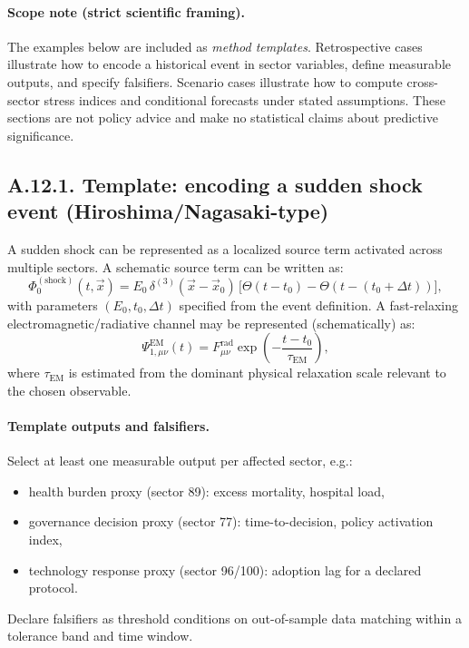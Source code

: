 \documentclass[13pt,a4paper]{article}
\begin{document}
	\paragraph{Scope note (strict scientific framing).}
	The examples below are included as \emph{method templates}. Retrospective cases illustrate how to encode a historical event in sector variables, define measurable outputs, and specify falsifiers. Scenario cases illustrate how to compute cross-sector stress indices and conditional forecasts under stated assumptions. These sections are not policy advice and make no statistical claims about predictive significance.
	
	\subsection*{A.12.1. Template: encoding a sudden shock event (Hiroshima/Nagasaki-type)}
	
	A sudden shock can be represented as a localized source term activated across multiple sectors. A schematic source term can be written as:
	$$
	\Phi_{0}^{(\mathrm{shock})}(t,\vec{x}) = E_0\,\delta^{(3)}(\vec{x}-\vec{x}_0)\,\big[\Theta(t-t_0)-\Theta(t-(t_0+\Delta t))\big],
	$$
	with parameters $(E_0,t_0,\Delta t)$ specified from the event definition. A fast-relaxing electromagnetic/radiative channel may be represented (schematically) as:
	$$
	\Psi_{1,\mu\nu}^{\mathrm{EM}}(t)=F_{\mu\nu}^{\mathrm{rad}}\exp\!\left(-\frac{t-t_0}{\tau_{\mathrm{EM}}}\right),
	$$
	where $\tau_{\mathrm{EM}}$ is estimated from the dominant physical relaxation scale relevant to the chosen observable.
	
	\paragraph{Template outputs and falsifiers.}
	Select at least one measurable output per affected sector, e.g.:
	\begin{itemize}[leftmargin=*]
		\item health burden proxy (sector 89): excess mortality, hospital load,
		\item governance decision proxy (sector 77): time-to-decision, policy activation index,
		\item technology response proxy (sector 96/100): adoption lag for a declared protocol.
	\end{itemize}
	Declare falsifiers as threshold conditions on out-of-sample data matching within a tolerance band and time window.
	
\end{document}
